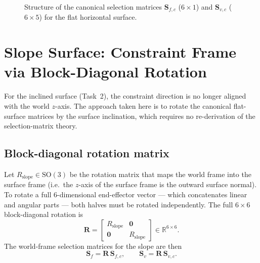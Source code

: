 \documentclass[
	german,%
	accentcolor=9c,%
	ruledheaders=section,%
	class=report,%
	thesis={type=bachelor},%
	fontsize=11pt,%
	parskip=half-,%
	custommargins=true,%
	marginpar=false,%
]{tudapub}
\begin{document}
\begin{figure}[htbp]
    \centering
    \caption{Structure of the canonical selection matrices $\mathbf{S}_{f,c}$
             ($6\times1$) and $\mathbf{S}_{v,c}$ ($6\times5$) for the flat
             horizontal surface.}
    \label{fig:selection_matrices}
\end{figure}


\section{Slope Surface: Constraint Frame via Block-Diagonal Rotation}
\label{sec:slope_frame}

For the inclined surface (Task~2), the constraint direction is no longer
aligned with the world $z$-axis.
The approach taken here is to rotate the canonical flat-surface matrices
by the surface inclination, which requires no re-derivation of the
selection-matrix theory.

\subsection*{Block-diagonal rotation matrix}

Let $R_\text{slope} \in \mathrm{SO}(3)$ be the rotation matrix that maps
the world frame into the surface frame (i.e.\ the $z$-axis of the surface
frame is the outward surface normal).
To rotate a full $6$-dimensional end-effector vector — which concatenates
linear and angular parts — both halves must be rotated independently.
The full $6\times 6$ block-diagonal rotation is
\begin{equation}
    \mathbf{R} =
    \begin{bmatrix} R_\text{slope} & \mathbf{0} \\ \mathbf{0} & R_\text{slope} \end{bmatrix}
    \in \mathbb{R}^{6 \times 6}.
    \label{eq:R_block}
\end{equation}
The world-frame selection matrices for the slope are then
\begin{equation}
    \mathbf{S}_f = \mathbf{R}\,\mathbf{S}_{f,c}, \qquad
    \mathbf{S}_v = \mathbf{R}\,\mathbf{S}_{v,c}.
    \label{eq:slope_selection}
\end{equation}
\end{document}
